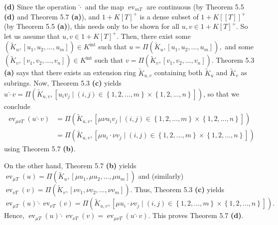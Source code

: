 \documentclass[12pt,final,notitlepage,onecolumn,german]{article}%
\begin{document}
\textbf{(d)} Since the operation $\widehat{\cdot}$ and the map
$\operatorname*{ev}_{mT}$ are continuous (by Theorem 5.5 \textbf{(d) }and
Theorem 5.7 \textbf{(a)}), and $1+K\left[  T\right]  ^{+}$ is a dense subset
of $1+K\left[  \left[  T\right]  \right]  ^{+}$ (by Theorem 5.5 \textbf{(a)}),
this needs only to be shown for all $u,v\in1+K\left[  T\right]  ^{+}$. So let
us assume that $u,v\in1+K\left[  T\right]  ^{+}$. Then, there exist some
$\left(  \widetilde{K}_{u},\left[  u_{1},u_{2},...,u_{m}\right]  \right)  \in
K^{\operatorname*{int}}$ such that $u=\Pi\left(  \widetilde{K}_{u},\left[
u_{1},u_{2},...,u_{m}\right]  \right)  ,$ and some $\left(  \widetilde{K}%
_{v},\left[  v_{1},v_{2},...,v_{n}\right]  \right)  \in K^{\operatorname*{int}%
}$ such that $v=\Pi\left(  \widetilde{K}_{v},\left[  v_{1},v_{2}%
,...,v_{n}\right]  \right)  $. Theorem 5.3 \textbf{(a)} says that there exists
an extension ring $\widetilde{K}_{u,v}$ containing both $\widetilde{K}_{u}$
and $\widetilde{K}_{v}$ as subrings. Now, Theorem 5.3 \textbf{(c)} yields
$u\widehat{\cdot}v=\Pi\left(  \widetilde{K}_{u,v},\left[  u_{i}v_{j}%
\mid\left(  i,j\right)  \in\left\{  1,2,...,m\right\}  \times\left\{
1,2,...,n\right\}  \right]  \right)  $, so that we conclude%
\begin{align*}
\operatorname*{ev}\nolimits_{\mu\nu T}\left(  u\widehat{\cdot}v\right)   &
=\Pi\left(  \widetilde{K}_{u,v},\left[  \mu\nu u_{i}v_{j}\mid\left(
i,j\right)  \in\left\{  1,2,...,m\right\}  \times\left\{  1,2,...,n\right\}
\right]  \right) \\
&  =\Pi\left(  \widetilde{K}_{u,v},\left[  \mu u_{i}\cdot\nu v_{j}\mid\left(
i,j\right)  \in\left\{  1,2,...,m\right\}  \times\left\{  1,2,...,n\right\}
\right]  \right)
\end{align*}
using Theorem 5.7 \textbf{(b)}.

On the other hand, Theorem 5.7 \textbf{(b)} yields $\operatorname*{ev}_{\mu
T}\left(  u\right)  =\Pi\left(  \widetilde{K}_{u},\left[  \mu u_{1},\mu
u_{2},...,\mu u_{m}\right]  \right)  $ and (similarly) $\operatorname*{ev}%
_{\nu T}\left(  v\right)  =\Pi\left(  \widetilde{K}_{v},\left[  \nu v_{1},\nu
v_{2},...,\nu v_{m}\right]  \right)  $. Thus, Theorem 5.3 \textbf{(c)} yields%
\[
\operatorname*{ev}\nolimits_{\mu T}\left(  u\right)  \widehat{\cdot
}\operatorname*{ev}\nolimits_{\nu T}\left(  v\right)  =\Pi\left(
\widetilde{K}_{u,v},\left[  \mu u_{i}\cdot\nu v_{j}\mid\left(  i,j\right)
\in\left\{  1,2,...,m\right\}  \times\left\{  1,2,...,n\right\}  \right]
\right)  .
\]
Hence, $\operatorname*{ev}_{\mu T}\left(  u\right)  \widehat{\cdot
}\operatorname*{ev}_{\nu T}\left(  v\right)  =\operatorname*{ev}_{\mu\nu
T}\left(  u\widehat{\cdot}v\right)  $. This proves Theorem 5.7 \textbf{(d)}.
\end{document}
